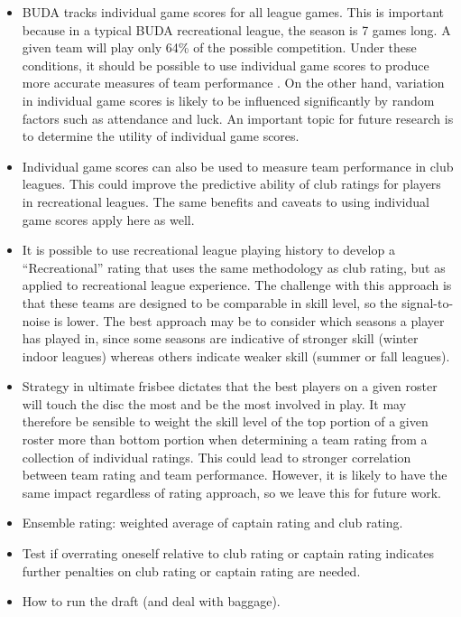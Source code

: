 \begin{itemize}

\item BUDA tracks individual game scores for all league games. This is important because in a typical BUDA recreational league, the season is 7 games long. A given team will play only 64\% of the possible competition. Under these conditions, it should be possible to use individual game scores to produce more accurate measures of team performance \cite{Langville_2012}. On the other hand, variation in individual game scores is likely to be influenced significantly by random factors such as attendance and luck. An important topic for future research is to determine the utility of individual game scores.

\item Individual game scores can also be used to measure team performance in club leagues. This could improve the predictive ability of club ratings for players in recreational leagues. The same benefits and caveats to using individual game scores apply here as well.

\item It is possible to use recreational league playing history to develop a ``Recreational'' rating that uses the same methodology as club rating, but as applied to recreational league experience. The challenge with this approach is that these teams are designed to be comparable in skill level, so the signal-to-noise is lower. The best approach may be to consider which seasons a player has played in, since some seasons are indicative of stronger skill (winter indoor leagues) whereas others indicate weaker skill (summer or fall leagues).

\item Strategy in ultimate frisbee dictates that the best players on a given roster will touch the disc the most and be the most involved in play.  It may therefore be sensible to weight the skill level of the top portion of a given roster more than bottom portion when determining a team rating from a collection of individual ratings. This could lead to stronger correlation between team rating and team performance. However, it is likely to have the same impact regardless of rating approach, so we leave this for future work.

\item Ensemble rating: weighted average of captain rating and club rating.

\item Test if overrating oneself relative to club rating or captain rating indicates further penalties on club rating or captain rating are needed.

\item How to run the draft (and deal with baggage).

\end{itemize}